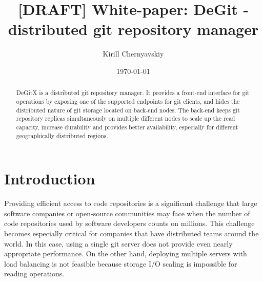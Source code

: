 \documentclass[acmlarge, screen, nonacm, 11pt]{acmart}
\date{\small\today}
\title[DeGit white paper]{[DRAFT] White-paper: DeGit - distributed git repository manager}
\author{Kirill Chernyavskiy}
\begin{document}
\raggedbottom

\begin{abstract}
  DeGitX is a distributed git repository manager.
  It provides a front-end interface for git operations by
  exposing one of the supported endpoints for git clients, and
  hides the distributed nature of git storage located on back-end nodes.
  The back-end keeps git repository replicas simultaneously on
  multiple different nodes to scale up the read capacity,
  increase durability and provides better availability, especially
  for different geographically distributed regions.
\end{abstract}

\maketitle

\section{Introduction}\label{sec:intro}

Providing efficient access to code repositories is a significant challenge
that large software companies or open-source communities may face when
the number of code repositories used by software developers counts
on millions. This challenge becomes especially critical for companies
that have distributed teams around the world. In this case, using a single
git server does not provide even nearly appropriate performance.
On the other hand, deploying multiple servers with load balancing is not feasible
because storage I/O scaling is impossible for reading operations.
\end{document}
